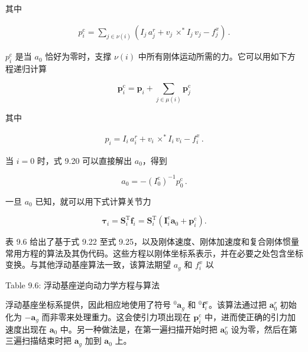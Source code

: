 \documentclass[10pt,a4paper]{book}
\theoremstyle{thmstyle} %
\theoremstyle{defstyle} %
\theoremstyle{prostyle} %
\begin{document}
其中



$$
\begin{array}{r} { p _ { i } ^{\mathrm { c} } = \sum _ { j \in \nu ( i ) } ( I _ { j } \, a _ { j } ^{r} + v _ { j } \, \times ^{*} I _ { j } \, v _ { j } - f _ { j } ^{x} ) \, . } \end{array}
$$



$p_{i}^{\mathrm{c}}$ 是当 $a_{0}$ 恰好为零时，支撑 $\nu(i)$ 中所有刚体运动所需的力。它可以用如下方程递归计算



$$
{ \boldsymbol { p } } _ { i } ^{\mathrm { c} } = { \boldsymbol { p } } _ { i } + \sum _ { j \in \mu ( i ) } { \boldsymbol { p } } _ { j } ^{\mathrm { c} }
$$



其中



$$
\begin{array}{r} { p _ { i } = I _ { i } \, a _ { i } ^{r} + v _ { i } \, \times ^{*} I _ { i } \, v _ { i } - f _ { i } ^{x} \, . } \end{array}
$$



当 $i=0$ 时，式 9.20 可以直接解出 $a_{0}$，得到



$$
a _ { 0 } = - ( I _ { 0 } ^{\mathrm { c} } ) ^{- 1} p _ { 0 } ^{\mathrm { c} } \, .
$$



一旦 $a_{0}$ 已知，就可以用下式计算关节力



$$
\boldsymbol { \tau } _ { i } = \boldsymbol { S } _ { i } ^{\mathrm { T} } \boldsymbol { f } _ { i } = \boldsymbol { S } _ { i } ^{\mathrm { T} } \left( \boldsymbol { I } _ { i } ^{\mathrm { c} } \boldsymbol { a } _ { 0 } + \boldsymbol { p } _ { i } ^{\mathrm { c} } \right) .
$$



表 9.6 给出了基于式 9.22 至式 9.25，以及刚体速度、刚体加速度和复合刚体惯量常用方程的算法及其伪代码。这些方程以刚体坐标系表示，并在必要之处包含坐标变换。与其他浮动基座算法一致，该算法期望 $a_{g}$ 和 $f_{i}^{x}$ 以



Table 9.6: 浮动基座逆向动力学方程与算法





浮动基座坐标系提供，因此相应地使用了符号 $^{0}\boldsymbol{a}_{g}$ 和 $^{0}\boldsymbol{f}_{i}^{x}$。该算法通过把 $\boldsymbol{a}_{0}^{r}$ 初始化为 $-\boldsymbol{a}_{g}$ 而非零来处理重力。这会使引力项出现在 $\boldsymbol{p}_{i}^{\mathrm{c}}$ 中，进而使正确的引力加速度出现在 $\boldsymbol{a}_{0}$ 中。另一种做法是，在第一遍扫描开始时把 $\boldsymbol{a}_{0}^{r}$ 设为零，然后在第三遍扫描结束时把 $\boldsymbol{a}_{g}$ 加到 $\boldsymbol{a}_{0}$ 上。
\end{document}
